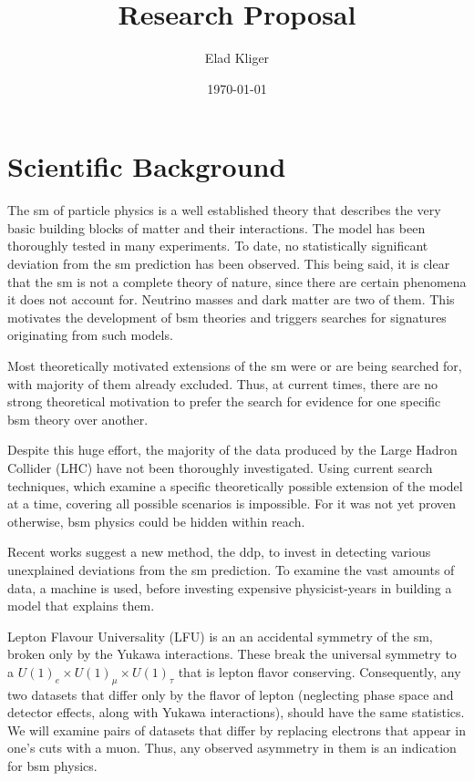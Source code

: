 \documentclass{article}
\title{Research Proposal}
\author{Elad Kliger}
\date{\today}
\begin{document}
\maketitle

\section{Scientific Background}

The \gls{sm} of particle physics is a well established theory that describes the very basic building blocks of matter and their interactions. The model has been thoroughly tested in many experiments. To date, no statistically significant deviation from the \gls{sm} prediction has been observed.
This being said, it is clear that the \gls{sm} is not a complete theory of nature, since there are certain phenomena it does not account for. Neutrino masses and dark matter are two of them. This motivates the development of \gls{bsm} theories and triggers searches for signatures originating from such models.

Most theoretically motivated extensions of the \gls{sm} were or are being searched for, with majority of them already excluded. Thus, at current times, there are no strong theoretical motivation to prefer the search for evidence for one specific \gls{bsm} theory over another.

Despite this huge effort, the majority of the data produced by the Large Hadron Collider (LHC) have not been thoroughly investigated. Using current search techniques, which examine a specific theoretically possible extension of the model at a time, covering all possible scenarios is impossible. For it was not yet proven otherwise, \gls{bsm} physics could be hidden within reach.

Recent works suggest a new method, the \gls{ddp}\cite{LastDDPpaper}, to invest in detecting various unexplained deviations from the \gls{sm} prediction. To examine the vast amounts of data, a machine is used, before investing expensive physicist-years in building a model that explains them.

Lepton Flavour Universality (LFU) is an an accidental symmetry of the \gls{sm}, broken only by the Yukawa interactions. These break the universal symmetry to a $U(1)_{e} \times U(1)_{\mu} \times U(1)_{\tau}$ that is lepton flavor conserving. Consequently, any two datasets that differ only by the flavor of lepton (neglecting phase space and detector effects, along with Yukawa interactions), should have the same statistics\cite{LeptonFlavorViolationHiggsDecays}. We will examine pairs of datasets that differ by replacing electrons that appear in one's cuts with a muon. Thus, any observed asymmetry in them is an indication for \gls{bsm} physics. 
\end{document}
